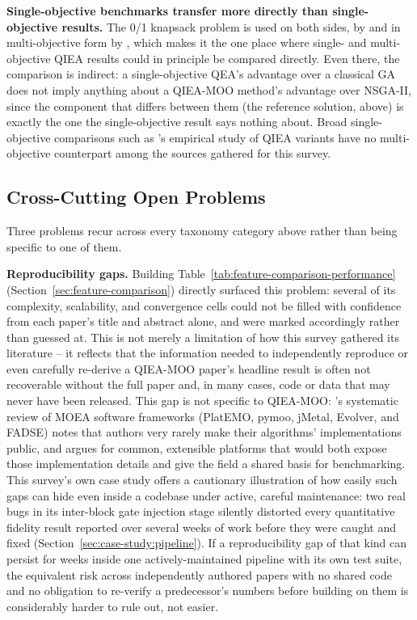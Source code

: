 \textbf{Single-objective benchmarks transfer more directly than
single-objective results.} The 0/1 knapsack problem is used on both
sides, by \citet{han2002qea} and in multi-objective form by
\citet{kim2006qmea}, which makes it the one place where single- and
multi-objective QIEA results could in principle be compared directly.
Even there, the comparison is indirect: a single-objective QEA's
advantage over a classical GA does not imply anything about a QIEA-MOO
method's advantage over NSGA-II, since the component that differs
between them (the reference solution, above) is exactly the one the
single-objective result says nothing about. Broad single-objective
comparisons such as \citet{zhang2011qieasurvey}'s empirical study of
QIEA variants have no multi-objective counterpart among the sources
gathered for this survey.

\subsection{Cross-Cutting Open Problems}
\label{sec:critical-analysis:cross-cutting}

Three problems recur across every taxonomy category above rather than
being specific to one of them.

\textbf{Reproducibility gaps.} Building
Table~\ref{tab:feature-comparison-performance}
(Section~\ref{sec:feature-comparison}) directly surfaced this problem:
several of its complexity, scalability, and convergence cells could not
be filled with confidence from each paper's title and abstract alone,
and were marked accordingly rather than guessed at. This is not merely
a limitation of how this survey gathered its literature -- it reflects
that the information needed to independently reproduce or even
carefully re-derive a QIEA-MOO paper's headline result is often not
recoverable without the full paper and, in many cases, code or data
that may never have been released. This gap is not specific to
QIEA-MOO: \citet{patrausanu2024frameworks}'s systematic review of MOEA
software frameworks (PlatEMO, pymoo, jMetal, Evolver, and FADSE) notes
that authors very rarely make their algorithms' implementations public,
and argues for common, extensible platforms that would both expose those
implementation details and give the field a shared basis for
benchmarking. This survey's own case study offers
a cautionary illustration of how easily such gaps can hide even inside
a codebase under active, careful maintenance: two real bugs in its
inter-block gate injection stage silently distorted every quantitative
fidelity result reported over several weeks of work before they were
caught and fixed (Section~\ref{sec:case-study:pipeline}). If a
reproducibility gap of
that kind can persist for weeks inside one actively-maintained pipeline
with its own test suite, the equivalent risk across independently
authored papers with no shared code and no obligation to re-verify a
predecessor's numbers before building on them is considerably harder to
rule out, not easier.

